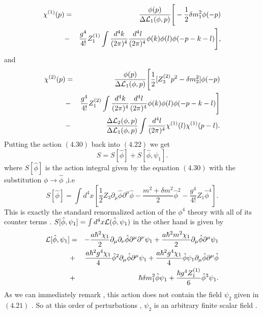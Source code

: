 \documentclass[a4paper,12pt]{article}
\begin{document}
\begin{eqnarray}
{\chi}^{(1)}(p)&=&\frac{\phi(p)}{{\Delta}{\cal L}_1(\phi,p)}\Bigg[-\frac{1}{2}{\delta}m_1^2{\phi}(-p)\nonumber\\
&-& \frac{g^4}{4!}Z_1^{(1)}\int \frac{d^4k}{(2{\pi})^4}
\frac{d^4l}{(2{\pi})^4}{\phi}(k){\phi}(l){\phi}(-p-k-l)\Bigg],
\end{eqnarray}
and
\begin{eqnarray}
{\chi}^{(2)}(p)&=&\frac{\phi(p)}{{\Delta}{\cal L}_1(\phi,p)}\Bigg[\frac{1}{2}[Z_3^{(2)}p^2 - {\delta}m_2^2]{\phi}(-p)\nonumber\\
&-&\frac{g^4}{4!}Z_1^{(2)}\int \frac{d^4k}{(2{\pi})^4} \frac{d^4l}{(2{\pi})^4}{\phi}(k){\phi}(l){\phi}(-p-k-l)\Bigg]\nonumber\\
&-&\frac{{\Delta}{\cal
L}_2(\phi,p)}{{\Delta}{\cal L}_1(\phi,p)}\int
\frac{d^4l}{(2{\pi})^4}{\chi}^{(1)}(l){\chi}^{(1)}(p-l).
\end{eqnarray}
Putting the action $(4.30)$ back into $(4.22)$ we get
\begin{equation}
S=S[\hat{\phi}]+S[\hat{\phi},{\psi}_1].
\end{equation}
where $S[\hat{\phi}]$ is the action integral given by the
equation $(4.30)$ with the substitution
${\phi}{\longrightarrow}\hat{\phi}$ ,i.e
\begin{equation}
 S[\hat{\phi}]=\int d^4x[\frac{1}{2}Z_3{\partial}_{\mu}{\hat{\phi}}{\partial}^{\mu}{\hat{\phi}} -\frac{m^2+{\delta}m^2}{2}
 {\hat{\phi}}^2 - \frac{g^4}{4!}Z_1{\hat{\phi}}^4].
\end{equation}
This is exactly the standard renormalized action of the ${\phi}^4$ theory with all of its counter terms . $S[\hat{\phi},{\psi}_1]=\int d^4x {\cal L}(\hat{\phi},{\psi}_1)$
in the other hand is given by
\begin{eqnarray}
{\cal L}[\hat{\phi},{\psi}_1]&=&-\frac{a{\hbar}^2{\chi}_1}{2}{\partial}_{\mu}{\partial}_{\nu}{\hat{\phi}}
{\partial}^{\mu}{\partial}^{\nu}{\psi}_1 +\frac{a{\hbar}^2m^2{\chi}_1}{2}{\partial}_{\mu}{\hat{\phi}}
{\partial}^{\mu}{\psi}_1\nonumber\\
&+&\frac{a{\hbar}^2g^4{\chi}_1}{4}{\hat{\phi}}
^2{\partial}_{\mu}{\hat{\phi}}{\partial}^{\mu}{\psi}_1
+\frac{a{\hbar}^2g^4{\chi}_1}{4}
{\hat{\phi}}{\psi}_1{\partial}_{\mu}{\hat{\phi}}{\partial}^{\mu}{\hat{\phi}}\nonumber\\
&+&{\hbar}{\delta}m_1^2{\hat{\phi}}{\psi}_1 +
\frac{{\hbar}g^4Z_1^{(1)}}{6}{\hat{\phi}}^3{\psi}_1 .
\end{eqnarray}
As we can immediately remark , this action does not contain the field ${\psi}_2$ given in $(4.21)$ . So at this order of perturbations , ${\psi}_2$ is an arbitrary finite scalar field .
\end{document}
